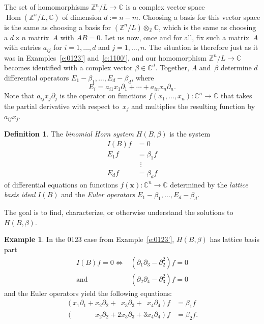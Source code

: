 \documentclass[12pt]{amsart}
\numberwithin{equation}{section}
\theoremstyle{definition}
\newtheorem{defn}[thm]{Definition}
\newtheorem{example}[thm]{Example}
\begin{document}
The set of homomorphisms ${\mathbb{Z}}^n/L \to {\mathbb{C}}$ is a complex vector space
$\operatorname{Hom}({\mathbb{Z}}^n/L,{\mathbb{C}})$ of dimension $d := n-m$.  Choosing a basis for
this vector space is the same as choosing a basis for $({\mathbb{Z}}^n/L)
\otimes_{\mathbb{Z}} {\mathbb{C}}$, which is the same as choosing a $d \times n$
matrix~$A$ with $AB = 0$.  Let us now, once and for all, fix such a
matrix~$A$ with entries $a_{ij}$ for $i = 1,\ldots,d$ and $j =
1,\ldots,n$.  The situation is therefore just as it was in
Examples~\ref{e:0123'} and~\ref{e:1100'}, and our homomorphism
${\mathbb{Z}}^n/L \to {\mathbb{C}}$ becomes identified with a complex vector $\beta \in
{\mathbb{C}}^d$.  Together, $A$ and~$\beta$ determine $d$ differential
operators $E_1 - \beta_1, \ldots, E_d - \beta_d$, where
$$  E_i = a_{i1} x_1{\partial}_1 + \cdots + a_{in}x_n{\partial}_n.
$$
Note that $a_{ij}x_j{\partial}_j$ is the operator on functions
$f(x_1,\ldots,x_n): {\mathbb{C}}^n \to {\mathbb{C}}$ that takes the partial derivative
with respect to~$x_j$ and multiplies the resulting function
by~$a_{ij}x_j$.

\begin{defn}\label{d:horn}
The \emph{binomial Horn system} $H(B,\beta)$ is the system
\begin{align*}
  I(B)f &= 0
\\
  E_1 f &= \beta_1 f
\\
        &\ \,\vdots
\\
  E_d f &= \beta_d f
\end{align*}
of differential equations on functions $f({\mathbf{x}}): {\mathbb{C}}^n \to {\mathbb{C}}$
determined by the \emph{lattice basis ideal} $I(B)$ and the
\emph{Euler operators} $E_1 - \beta_1, \ldots, E_d - \beta_d$.
\end{defn}

The goal is to find, characterize, or otherwise understand the
solutions to~$H(B,\beta)$.

\begin{example}\label{e:0123B'}
In the 0123 case from Example~\ref{e:0123'}, $H(B,\beta)$ has lattice
basis part
\begin{align*}
  I(B)f = 0 {\Leftrightarrow}\mbox{}& ({\partial}_1{\partial}_3 - {\partial}_2^2)f = 0
\\          \text{and }& ({\partial}_2{\partial}_4 - {\partial}_3^2)f = 0
\end{align*}
and the Euler operators yield the following equations:
\begin{align*}
  (x_1{\partial}_1 + x_2{\partial}_2 + \phantom{2}x_3{\partial}_3 + \phantom{3}x_4{\partial}_4) f &= \beta_1 f
\\(\phantom{x_1{\partial}_1 + \mbox{}}x_2{\partial}_2 + 2x_3{\partial}_3 + 3x_4{\partial}_4) f &= \beta_2 f.
\end{align*}
\end{example}
\end{document}
